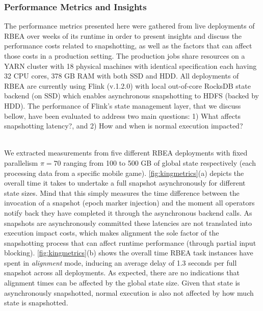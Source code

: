 \subsubsection{Performance Metrics and Insights} The performance metrics presented here were gathered from live deployments of RBEA over weeks of its runtime in order to present insights and discuss the performance costs related to snapshotting, as well as the factors that can affect those costs in a production setting. The production jobs share resources on a YARN cluster with 18 physical machines with identical specification each having 32 CPU cores, 378 GB RAM with both SSD and HDD. All deployments of RBEA are currently using Flink (v.1.2.0) with local out-of-core RocksDB state backend (on SSD) which enables asynchronous snapshotting to HDFS (backed by HDD). The performance of Flink's state management layer, that we discuss bellow,  have been evaluated to address two main questions: 1) What affects  snapshotting latency?, and 2) How and when is normal execution impacted?

 \\
We extracted measurements from five different RBEA deployments with fixed parallelism $\pi = 70$ ranging from 100 to 500 GB of global state respectively (each processing data from a specific mobile game). \autoref{fig:kingmetrics}(a) depicts the overall time it takes to undertake a full snapshot asynchronously for different state sizes. Mind that this simply measures the time difference between the invocation of a snapshot (epoch marker injection) and the moment all operators notify back they have completed it through the asynchronous backend calls. As snapshots are asynchronously committed these latencies are not translated into execution impact costs, which makes alignment the sole factor of the snapshotting process that can affect runtime performance (through partial input blocking). \autoref{fig:kingmetrics}(b) shows the overall time RBEA task instances have spent in \emph{alignment} mode, inducing an average delay of 1.3 seconds per full snapshot across all deployments. As expected, there are no indications that alignment times can be affected by the global state size. Given that state is asynchronously snapshotted, normal execution is also not affected by how much state is snapshotted.

